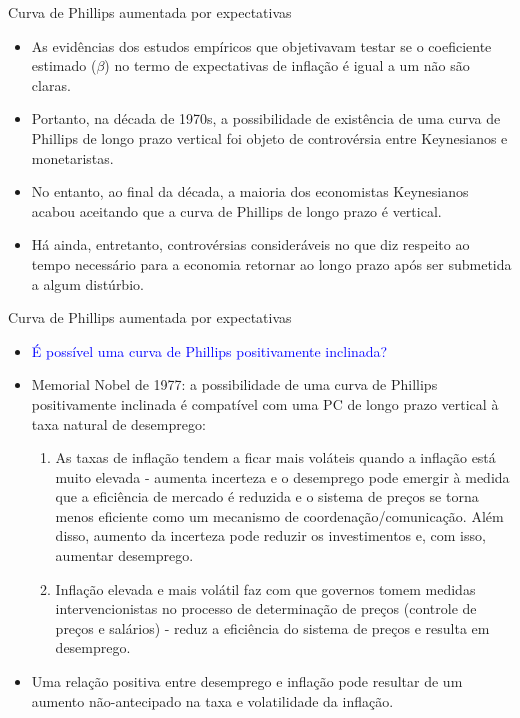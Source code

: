 \documentclass[10pt]{beamer}
\begin{document}
\begin{frame}{Curva de Phillips aumentada por expectativas}
    \begin{itemize}
        \item As evidências dos estudos empíricos que objetivavam testar se o coeficiente estimado ($\beta$) no termo de expectativas de inflação é igual a um não são claras.
        \bigskip
        \item Portanto, na década de 1970s, a possibilidade de existência de uma curva de Phillips de longo prazo vertical foi objeto de controvérsia entre Keynesianos e monetaristas.
        \bigskip
        \item No entanto, ao final da década, a maioria dos economistas Keynesianos acabou aceitando que a curva de Phillips de longo prazo é vertical.
        \bigskip
        \item Há ainda, entretanto, controvérsias consideráveis no que diz respeito ao tempo necessário para a economia retornar ao longo prazo após ser submetida a algum distúrbio.
    \end{itemize}    
\end{frame}

\begin{frame}{Curva de Phillips aumentada por expectativas}
    \begin{itemize}
        \item \textcolor{blue}{É possível uma curva de Phillips positivamente inclinada?}
        \bigskip
        \item Memorial Nobel de 1977: a possibilidade de uma curva de Phillips positivamente inclinada é compatível com uma PC de longo prazo vertical à taxa natural de desemprego:
        \bigskip
        \begin{enumerate}
            \item As taxas de inflação tendem a ficar mais voláteis quando a inflação está muito elevada - aumenta incerteza e o desemprego pode emergir à medida que a eficiência de mercado é reduzida e o sistema de preços se torna menos eficiente como um mecanismo de coordenação/comunicação. Além disso, aumento da incerteza pode reduzir os investimentos e, com isso, aumentar desemprego.
            \bigskip
            \item Inflação elevada e mais volátil faz com que governos tomem medidas intervencionistas no processo de determinação de preços (controle de preços e salários) - reduz a eficiência do sistema de preços e resulta em desemprego.
        \end{enumerate}
        \bigskip
        \item Uma relação positiva entre desemprego e inflação pode resultar de um aumento não-antecipado na taxa e volatilidade da inflação.
    \end{itemize}    
\end{frame}
\end{document}
